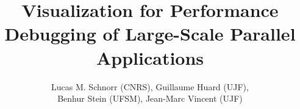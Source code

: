 \documentclass{beamer}
\title{Visualization for Performance Debugging of
Large-Scale Parallel Applications}
\author{Lucas M. Schnorr (CNRS), Guillaume Huard (UJF), \\
Benhur Stein (UFSM), Jean-Marc Vincent (UJF)}
\date{
-- SBAC-PAD 2009 Tutorial -- \\
S\~ao Paulo, Brazil\\
October 31st, 2009\\

\vspace{2cm}

\textit{\`a la m\'emoire de Jacques Chassin de Kergommeaux}
}
\begin{document}
\frame{\titlepage}
\frame{\tableofcontents}

\frame{\tableofcontents}


\frame{\tableofcontents}


\frame{\tableofcontents}


\end{document}
